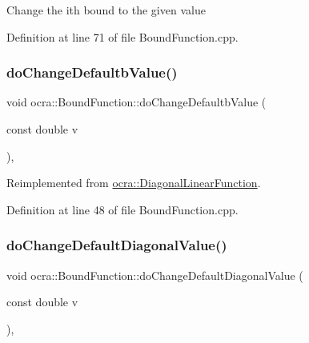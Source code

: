 Change the ith bound to the given value 

Definition at line 71 of file Bound\+Function.\+cpp.

\hypertarget{classocra_1_1BoundFunction_aa861028f4a37e45b4fc68b7852d7e451}{}\label{classocra_1_1BoundFunction_aa861028f4a37e45b4fc68b7852d7e451} 
\subsubsection{\texorpdfstring{do\+Change\+Defaultb\+Value()}{doChangeDefaultbValue()}}
{\footnotesize\ttfamily void ocra\+::\+Bound\+Function\+::do\+Change\+Defaultb\+Value (\begin{DoxyParamCaption}\item[{const double}]{v }\end{DoxyParamCaption})\hspace{0.3cm}{\ttfamily [protected]}, {\ttfamily [virtual]}}



Reimplemented from \hyperlink{classocra_1_1DiagonalLinearFunction_a9995af94055dc443c10018869a393635}{ocra\+::\+Diagonal\+Linear\+Function}.



Definition at line 48 of file Bound\+Function.\+cpp.

\hypertarget{classocra_1_1BoundFunction_af02c8fc499fb37596c758861d98cfbf6}{}\label{classocra_1_1BoundFunction_af02c8fc499fb37596c758861d98cfbf6} 
\subsubsection{\texorpdfstring{do\+Change\+Default\+Diagonal\+Value()}{doChangeDefaultDiagonalValue()}}
{\footnotesize\ttfamily void ocra\+::\+Bound\+Function\+::do\+Change\+Default\+Diagonal\+Value (\begin{DoxyParamCaption}\item[{const double}]{v }\end{DoxyParamCaption})\hspace{0.3cm}{\ttfamily [protected]}, {\ttfamily [virtual]}}



